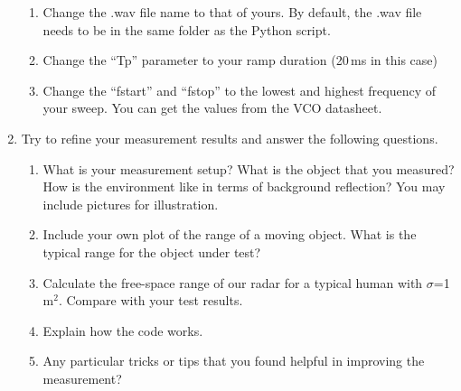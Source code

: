 \documentclass[letterpaper, 11pt]{article}
\begin{document}
\begin{enumerate}
		\begin{enumerate}
			\item Change the .wav file name to that of yours. By default, the .wav file needs to be in the same folder as the Python script.
			
			\item Change the ``Tp'' parameter to your ramp duration (20\,ms in this case)
			
			\item Change the ``fstart'' and ``fstop'' to the lowest and highest frequency of your sweep. You can get the values from the VCO datasheet. 
			
		\end{enumerate}
	\item Try to refine your measurement results and answer the following questions.
		\begin{enumerate}
			\item What is your measurement setup? What is the object that you measured? How is the environment like in terms of background reflection? You may include pictures for illustration. 
			
			\item Include your own plot of the range of a moving object. What is the typical range for the object under test? 
			
			\item Calculate the free-space range of our radar for a typical human with $\sigma$=1\,m$^2$. Compare with your test results.
			
			\item Explain how the code works. 
			
			\item Any particular tricks or tips that you found helpful in improving the measurement? 
			
		\end{enumerate} 
	
	
	
\end{enumerate}
\end{document}
